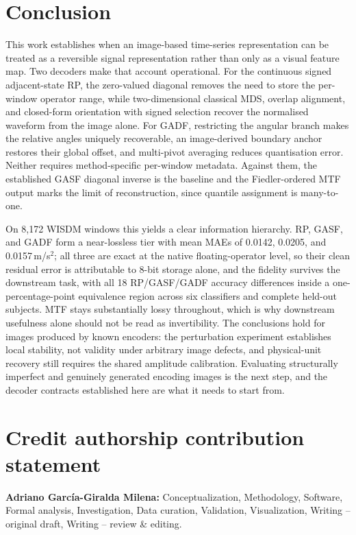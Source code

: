 \documentclass[preprint,12pt]{elsarticle}
\begin{document}
\section{Conclusion}\label{sec:conclusion}

This work establishes when an image-based time-series representation can be treated as a reversible signal representation rather than only as a visual feature map. Two decoders make that account operational. For the continuous signed adjacent-state RP, the zero-valued diagonal removes the need to store the per-window operator range, while two-dimensional classical MDS, overlap alignment, and closed-form orientation with signed selection recover the normalised waveform from the image alone. For GADF, restricting the angular branch makes the relative angles uniquely recoverable, an image-derived boundary anchor restores their global offset, and multi-pivot averaging reduces quantisation error. Neither requires method-specific per-window metadata. Against them, the established GASF diagonal inverse is the baseline and the Fiedler-ordered MTF output marks the limit of reconstruction, since quantile assignment is many-to-one.

On 8,172 WISDM windows this yields a clear information hierarchy. RP, GASF, and GADF form a near-lossless tier with mean MAEs of 0.0142, 0.0205, and 0.0157\,m/s$^2$; all three are exact at the native floating-operator level, so their clean residual error is attributable to 8-bit storage alone, and the fidelity survives the downstream task, with all 18 RP/GASF/GADF accuracy differences inside a one-percentage-point equivalence region across six classifiers and complete held-out subjects. MTF stays substantially lossy throughout, which is why downstream usefulness alone should not be read as invertibility. The conclusions hold for images produced by known encoders: the perturbation experiment establishes local stability, not validity under arbitrary image defects, and physical-unit recovery still requires the shared amplitude calibration. Evaluating structurally imperfect and genuinely generated encoding images is the next step, and the decoder contracts established here are what it needs to start from.

\section*{Credit authorship contribution statement}

\noindent
\textbf{Adriano García-Giralda Milena:}
Conceptualization, Methodology, Software, Formal analysis,
Investigation, Data curation, Validation, Visualization,
Writing -- original draft, Writing -- review \& editing.
\end{document}
